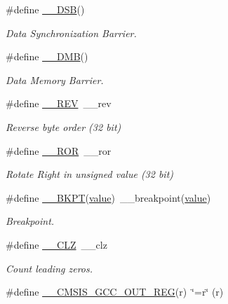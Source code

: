 \begin{DoxyCompactItemize}
\#define \hyperlink{group___c_m_s_i_s___core___instruction_interface_ga067d257a2b34565410acefb5afef2203}{\+\_\+\+\_\+\+D\+SB}()
\begin{DoxyCompactList}\small\item\em Data Synchronization Barrier. \end{DoxyCompactList}\item 
\#define \hyperlink{group___c_m_s_i_s___core___instruction_interface_ga671101179b5943990785f36f8c1e2269}{\+\_\+\+\_\+\+D\+MB}()
\begin{DoxyCompactList}\small\item\em Data Memory Barrier. \end{DoxyCompactList}\item 
\#define \hyperlink{group___c_m_s_i_s___core___instruction_interface_ga14f54807872c0f5e05604c4924abfdae}{\+\_\+\+\_\+\+R\+EV}~\+\_\+\+\_\+rev
\begin{DoxyCompactList}\small\item\em Reverse byte order (32 bit) \end{DoxyCompactList}\item 
\#define \hyperlink{group___c_m_s_i_s___core___instruction_interface_ga95b9bd281ddeda378b85afdb8f2ced86}{\+\_\+\+\_\+\+R\+OR}~\+\_\+\+\_\+ror
\begin{DoxyCompactList}\small\item\em Rotate Right in unsigned value (32 bit) \end{DoxyCompactList}\item 
\#define \hyperlink{group___c_m_s_i_s___core___instruction_interface_ga15ea6bd3c507d3e81c3b3a1258e46397}{\+\_\+\+\_\+\+B\+K\+PT}(\hyperlink{semihosting_8h_aacce635d68067370c70caa2381ea1040}{value})~\+\_\+\+\_\+breakpoint(\hyperlink{semihosting_8h_aacce635d68067370c70caa2381ea1040}{value})
\begin{DoxyCompactList}\small\item\em Breakpoint. \end{DoxyCompactList}\item 
\#define \hyperlink{group___c_m_s_i_s___core___instruction_interface_ga5d5bb1527e042be4a9fa5a33f65cc248}{\+\_\+\+\_\+\+C\+LZ}~\+\_\+\+\_\+clz
\begin{DoxyCompactList}\small\item\em Count leading zeros. \end{DoxyCompactList}\item 
\#define \hyperlink{group___c_m_s_i_s___core___instruction_interface_gabc17e391c13c71702366c67cba39c276}{\+\_\+\+\_\+\+C\+M\+S\+I\+S\+\_\+\+G\+C\+C\+\_\+\+O\+U\+T\+\_\+\+R\+EG}(r)~\char`\"{}=r\char`\"{} (r)

\end{DoxyCompactItemize}
